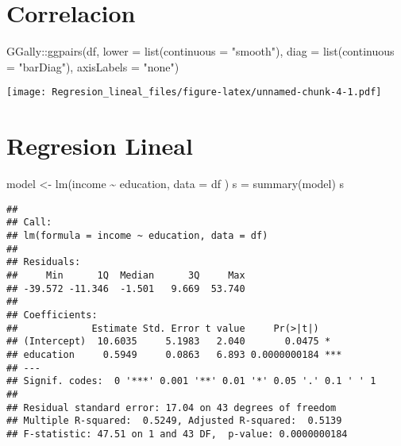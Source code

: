 \documentclass[
]{article}
\newenvironment{Shaded}{\begin{snugshade}}{\end{snugshade}}
\newcommand{\AttributeTok}[1]{\textcolor[rgb]{0.77,0.63,0.00}{#1}}
\newcommand{\FunctionTok}[1]{\textcolor[rgb]{0.00,0.00,0.00}{#1}}
\newcommand{\NormalTok}[1]{#1}
\newcommand{\OtherTok}[1]{\textcolor[rgb]{0.56,0.35,0.01}{#1}}
\newcommand{\SpecialCharTok}[1]{\textcolor[rgb]{0.00,0.00,0.00}{#1}}
\newcommand{\StringTok}[1]{\textcolor[rgb]{0.31,0.60,0.02}{#1}}
\begin{document}
\hypertarget{correlacion}{%
\section{Correlacion}\label{correlacion}}

\begin{Shaded}
\begin{Highlighting}[]
\NormalTok{GGally}\SpecialCharTok{::}\FunctionTok{ggpairs}\NormalTok{(df, }\AttributeTok{lower =} \FunctionTok{list}\NormalTok{(}\AttributeTok{continuous =} \StringTok{"smooth"}\NormalTok{),}
        \AttributeTok{diag =} \FunctionTok{list}\NormalTok{(}\AttributeTok{continuous =} \StringTok{"barDiag"}\NormalTok{), }\AttributeTok{axisLabels =} \StringTok{"none"}\NormalTok{)}
\end{Highlighting}
\end{Shaded}

\texttt{[image: Regresion\_lineal\_files/figure-latex/unnamed-chunk-4-1.pdf]}

\hypertarget{regresion-lineal}{%
\section{Regresion Lineal}\label{regresion-lineal}}

\begin{Shaded}
\begin{Highlighting}[]
\NormalTok{model }\OtherTok{\textless{}{-}} \FunctionTok{lm}\NormalTok{(income  }\SpecialCharTok{\textasciitilde{}}\NormalTok{ education, }\AttributeTok{data =}\NormalTok{ df )}
\NormalTok{s }\OtherTok{=} \FunctionTok{summary}\NormalTok{(model)}
\NormalTok{s}
\end{Highlighting}
\end{Shaded}

\begin{verbatim}
## 
## Call:
## lm(formula = income ~ education, data = df)
## 
## Residuals:
##     Min      1Q  Median      3Q     Max 
## -39.572 -11.346  -1.501   9.669  53.740 
## 
## Coefficients:
##             Estimate Std. Error t value     Pr(>|t|)    
## (Intercept)  10.6035     5.1983   2.040       0.0475 *  
## education     0.5949     0.0863   6.893 0.0000000184 ***
## ---
## Signif. codes:  0 '***' 0.001 '**' 0.01 '*' 0.05 '.' 0.1 ' ' 1
## 
## Residual standard error: 17.04 on 43 degrees of freedom
## Multiple R-squared:  0.5249, Adjusted R-squared:  0.5139 
## F-statistic: 47.51 on 1 and 43 DF,  p-value: 0.0000000184
\end{verbatim}
\end{document}
